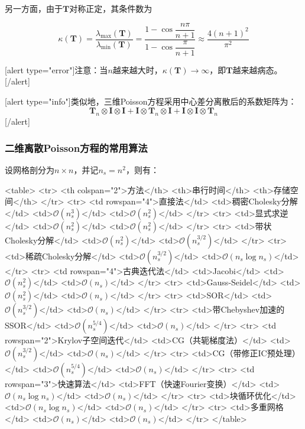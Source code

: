 \documentclass[12pt, UTF8, nofonts]{ctexart}
\begin{document}
另一方面，由于$\boldsymbol{T}$对称正定，其条件数为

\[
    \kappa(\boldsymbol{T}) = \dfrac{\lambda_{\max}(\boldsymbol{T})}{\lambda_{\min}(\boldsymbol{T})} =
    \dfrac{1-\cos\dfrac{n\pi}{n+1}}{1-\cos\dfrac{\pi}{n+1}} \approx
    \dfrac{4(n+1)^2}{\pi^2}
\]

[alert type="error"]注意：当$n$越来越大时，$\kappa(\boldsymbol{T})\to\infty$，即$\boldsymbol{T}$越来越病态。[/alert]

[alert type="info"]类似地，三维Poisson方程采用中心差分离散后的系数矩阵为：\[\boldsymbol{T}_n\otimes\boldsymbol{I}\otimes\boldsymbol{I}+\boldsymbol{I}\otimes\boldsymbol{T}_n\otimes\boldsymbol{I}+\boldsymbol{I}\otimes\boldsymbol{I}\otimes\boldsymbol{T}_n\][/alert]

\subsubsection*{二维离散Poisson方程的常用算法}

设网格剖分为$n \times n$，并记$n_s=n^2$，则有：

<table>
  <tr>
    <th colspan="2">方法</th>
    <th>串行时间</th>
    <th>存储空间</th>
  </tr>
  <tr>
    <td rowspan="4">直接法</td>
    <td>稠密Cholesky分解</td>
    <td>$\mathcal{O}(n_s^3)$</td>
    <td>$\mathcal{O}(n_s^2)$</td>
  </tr>
  <tr>
    <td>显式求逆</td>
    <td>$\mathcal{O}(n_s^2)$</td>
    <td>$\mathcal{O}(n_s^2)$</td>
  </tr>
  <tr>
    <td>带状Cholesky分解</td>
    <td>$\mathcal{O}(n_s^2)$</td>
    <td>$\mathcal{O}(n_s^{3/2})$</td>
  </tr>
  <tr>
    <td>稀疏Cholesky分解</td>
    <td>$\mathcal{O}(n_s^{3/2})$</td>
    <td>$\mathcal{O}(n_s\log n_s)$</td>
  </tr>
  <tr>
    <td rowspan="4">古典迭代法</td>
    <td>Jacobi</td>
    <td>$\mathcal{O}(n_s^2)$</td>
    <td>$\mathcal{O}(n_s)$</td>
  </tr>
  <tr>
    <td>Gauss-Seidel</td>
    <td>$\mathcal{O}(n_s^2)$</td>
    <td>$\mathcal{O}(n_s)$</td>
  </tr>
  <tr>
    <td>SOR</td>
    <td>$\mathcal{O}(n_s^{3/2})$</td>
    <td>$\mathcal{O}(n_s)$</td>
  </tr>
  <tr>
    <td>带Chebyshev加速的SSOR</td>
    <td>$\mathcal{O}(n_s^{5/4})$</td>
    <td>$\mathcal{O}(n_s)$</td>
  </tr>
  <tr>
    <td rowspan="2">Krylov子空间迭代</td>
    <td>CG（共轭梯度法）</td>
    <td>$\mathcal{O}(n_s^{3/2})$</td>
    <td>$\mathcal{O}(n_s)$</td>
  </tr>
  <tr>
    <td>CG（带修正IC预处理）</td>
    <td>$\mathcal{O}(n_s^{5/4})$</td>
    <td>$\mathcal{O}(n_s)$</td>
  </tr>
  <tr>
    <td rowspan="3">快速算法</td>
    <td>FFT（快速Fourier变换）</td>
    <td>$\mathcal{O}(n_s\log n_s)$</td>
    <td>$\mathcal{O}(n_s)$</td>
  </tr>
  <tr>
    <td>块循环优化</td>
    <td>$\mathcal{O}(n_s\log n_s)$</td>
    <td>$\mathcal{O}(n_s)$</td>
  </tr>
  <tr>
    <td>多重网格</td>
    <td>$\mathcal{O}(n_s)$</td>
    <td>$\mathcal{O}(n_s)$</td>
  </tr>
</table>
\end{document}
